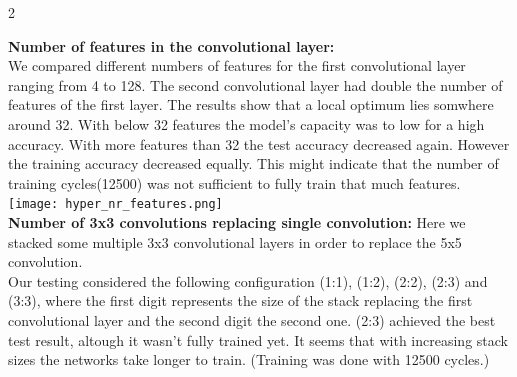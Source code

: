 \documentclass{article}
\begin{document}
\begin{ukon-infie}[3.12.17]{2}
\begin{exercise}[p=55]{}
{			\textbf{Number of features in the convolutional layer:}\\
			
			We compared different numbers of features for the first convolutional layer ranging from 4 to 128. The second convolutional layer had double the number of features of the first layer. The results show that a local optimum lies somwhere around 32. With below 32 features the model's capacity was to low for a high accuracy. With more features than 32 the test accuracy decreased again. However the training accuracy decreased equally. This might indicate that the number of training cycles(12500) was not sufficient to fully train that much features.\\
			
			\texttt{[image: hyper\_nr\_features.png]}\\
			
			\textbf{Number of 3x3 convolutions replacing single convolution:}
			Here we stacked some multiple 3x3 convolutional layers in order to replace the 5x5 convolution.\\
			Our testing considered the following configuration (1:1), (1:2), (2:2), (2:3) and (3:3), where the first digit represents the size of the stack replacing the first convolutional layer and the second digit the second one. (2:3) achieved the best test result, altough it wasn't fully trained yet. It seems that with increasing stack sizes the networks take longer to train. (Training was done with 12500 cycles.)\\
			
}
\end{exercise}
\end{ukon-infie}
\end{document}
